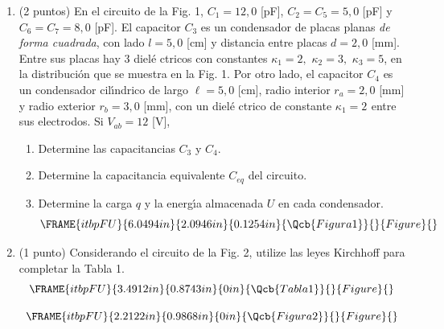\documentclass[onecolumn]{article}
\begin{document}
\begin{enumerate}
\item (2 puntos) En el circuito de la Fig. 1, $C_{1}=12,0$ [pF], $%
C_{2}=C_{5}=5,0$ $[$pF$]$ y $C_{6}=C_{7}=8,0$ [pF]. El capacitor $C_{3}$ es
un condensador de placas planas \textit{de forma cuadrada}, con lado $l=5,0$
[cm] y distancia entre placas $d=2,0$ [mm]. Entre sus placas hay 3 diel\'{e}%
ctricos con constantes $\kappa _{1}=2,$ $\kappa _{2}=3,$ $\kappa _{3}=5$, en
la distribuci\'{o}n que se muestra en la Fig. 1. Por otro lado, el capacitor 
$C_{4}$ es un condensador cil\'{\i}ndrico de largo $\ell =5,0$ [cm], radio
interior $r_{a}=2,0$ [mm] y radio exterior $r_{b}=3,0$ [mm], con un diel\'{e}%
ctrico de constante $\kappa _{1}=2\,\ $entre sus electrodos. Si $V_{ab}=12$
[V],

\begin{enumerate}
\item Determine las capacitancias $C_{3}$ y $C_{4}.$

\item Determine la capacitancia equivalente $C_{eq}$ del circuito.

\item Determine la carga $q$ y la energ\'{\i}a almacenada $U$ en cada
condensador. 
\begin{equation*}
\FRAME{itbpFU}{6.0494in}{2.0946in}{0.1254in}{\Qcb{Figura 1}}{}{Figure}{%
\special{language "Scientific Word";type "GRAPHIC";maintain-aspect-ratio
TRUE;display "USEDEF";valid_file "T";width 6.0494in;height 2.0946in;depth
0.1254in;original-width 14.976in;original-height 5.1586in;cropleft
"0";croptop "1";cropright "1";cropbottom "0";tempfilename
'TGBI6E01.bmp';tempfile-properties "XPR";}}
\end{equation*}
\end{enumerate}

\item (1 punto) Considerando el circuito de la Fig. 2, utilize las leyes
Kirchhoff para completar la Tabla 1.%
\begin{equation*}
\FRAME{itbpFU}{3.4912in}{0.8743in}{0in}{\Qcb{Tabla 1}}{}{Figure}{\special%
{language "Scientific Word";type "GRAPHIC";maintain-aspect-ratio
TRUE;display "USEDEF";valid_file "T";width 3.4912in;height 0.8743in;depth
0in;original-width 6.6565in;original-height 1.6457in;cropleft "0";croptop
"1";cropright "1";cropbottom "0";tempfilename
'TGA9GN04.wmf';tempfile-properties "XPR";}}
\end{equation*}

\begin{equation*}
\FRAME{itbpFU}{2.2122in}{0.9868in}{0in}{\Qcb{Figura 2}}{}{Figure}{\special%
{language "Scientific Word";type "GRAPHIC";maintain-aspect-ratio
TRUE;display "USEDEF";valid_file "T";width 2.2122in;height 0.9868in;depth
0in;original-width 6.3858in;original-height 2.8331in;cropleft "0";croptop
"1";cropright "1";cropbottom "0";tempfilename
'TGA9GB03.wmf';tempfile-properties "XPR";}}
\end{equation*}%
\pagebreak 


\end{enumerate}
\end{document}
